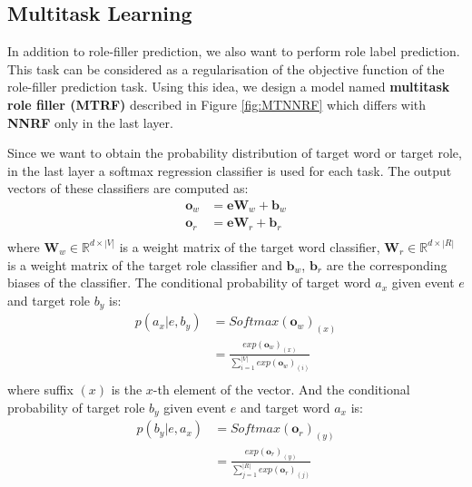\documentclass[a4paper]{article}
\begin{document}
\subsection{Multitask Learning} \label{sec:mtl}
In addition to role-filler prediction, we also want to perform role label prediction. This task can be considered as a regularisation of the objective function of the role-filler prediction task. Using this idea, we design a model named \textbf{multitask role filler (MTRF)} described in Figure \ref{fig:MTNNRF} which differs with \textbf{NNRF} only in the last layer. 

Since we want to obtain the probability distribution of target word or target role, in the last layer a softmax regression classifier is used for each task. The output vectors of these classifiers are computed as:
\begin{equation} \label{eq:output_mt}
\begin{aligned}
    \mathbf{o}_w
        &= \mathbf{e}\mathbf{W}_w + \mathbf{b}_w \\
    \mathbf{o}_r
        &= \mathbf{e}\mathbf{W}_r + \mathbf{b}_r \\
\end{aligned}
\end{equation}
where $\mathbf{W}_w \in \mathbb{R}^{d \times |V|}$ is a weight matrix of the target word classifier,  $\mathbf{W}_r \in \mathbb{R}^{d \times |R|}$ is a weight matrix of the target role classifier and $\mathbf{b}_w$, $\mathbf{b}_r$ are the corresponding biases of the classifier. The conditional probability of target word $a_x$ given event $e$ and target role $b_y$ is:
\begin{equation} \label{eq:softmax_w}
\begin{aligned}
    p(a_x | e, b_y)
        &= Softmax(\mathbf{o}_w)_{(x)} \\
        &= \frac{
        exp(\mathbf{o}_w)_{(x)}
        }{
        \sum_{i=1}^{|V|} exp(\mathbf{o}_w)_{(i)} }   \\
\end{aligned}
\end{equation}
where suffix $(x)$ is the $x$-th element of the vector. And the conditional probability of target role $b_y$ given event $e$ and target word $a_x$ is:
\begin{equation} \label{eq:softmax_r}
\begin{aligned}
    p(b_y | e, a_x)
        &= Softmax(\mathbf{o}_r)_{(y)} \\
        &= \frac{
        exp(\mathbf{o}_r)_{(y)}
        }{
        \sum_{j=1}^{|R|} exp(\mathbf{o}_r)_{(j)} }   \\
\end{aligned}
\end{equation}
\end{document}
